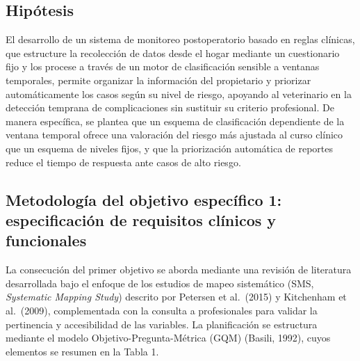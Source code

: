 \documentclass[stu, spanish]{apa7}
\begin{document}
\subsection{Hip\'{o}tesis}
El desarrollo de un sistema de monitoreo postoperatorio basado en reglas cl\'{i}nicas, que estructure la recolecci\'{o}n de datos desde el hogar mediante un cuestionario fijo y los procese a trav\'{e}s de un motor de clasificaci\'{o}n sensible a ventanas temporales, permite organizar la informaci\'{o}n del propietario y priorizar autom\'{a}ticamente los casos seg\'{u}n su nivel de riesgo, apoyando al veterinario en la detecci\'{o}n temprana de complicaciones sin sustituir su criterio profesional. De manera espec\'{i}fica, se plantea que un esquema de clasificaci\'{o}n dependiente de la ventana temporal ofrece una valoraci\'{o}n del riesgo m\'{a}s ajustada al curso cl\'{i}nico que un esquema de niveles fijos, y que la priorizaci\'{o}n autom\'{a}tica de reportes reduce el tiempo de respuesta ante casos de alto riesgo.

\subsection{Metodolog\'{i}a del objetivo espec\'{i}fico 1: especificaci\'{o}n de requisitos cl\'{i}nicos y funcionales}
La consecuci\'{o}n del primer objetivo se aborda mediante una revisi\'{o}n de literatura desarrollada bajo el enfoque de los estudios de mapeo sistem\'{a}tico (SMS, \textit{Systematic Mapping Study}) descrito por Petersen et al.\ (2015) y Kitchenham et al.\ (2009), complementada con la consulta a profesionales para validar la pertinencia y accesibilidad de las variables. La planificaci\'{o}n se estructura mediante el modelo Objetivo-Pregunta-M\'{e}trica (GQM) (Basili, 1992), cuyos elementos se resumen en la Tabla 1.
\end{document}

